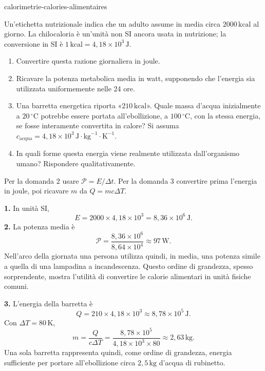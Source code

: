 \begin{exo}{calorimetrie-calories-alimentaires}

Un'etichetta nutrizionale indica che un adulto assume in media circa $2000\,\text{kcal}$ al giorno. La chilocaloria è un'unità non SI ancora usata in nutrizione; la conversione in SI è $1\,\text{kcal}=4{,}18\times10^3\,\text{J}$.

\begin{enumerate}
  \item Convertire questa razione giornaliera in joule.
  \item Ricavare la potenza metabolica media in watt, supponendo che l'energia sia utilizzata uniformemente nelle 24 ore.
  \item Una barretta energetica riporta «$210\,\text{kcal}$». Quale massa d'acqua inizialmente a $20\,^\circ\text{C}$ potrebbe essere portata all'ebollizione, a $100\,^\circ\text{C}$, con la stessa energia, se fosse interamente convertita in calore? Si assuma $c_{\text{acqua}}=4{,}18\times10^3\,\text{J}\!\cdot\!\text{kg}^{-1}\!\cdot\!\text{K}^{-1}$.
  \item In quali forme questa energia viene realmente utilizzata dall'organismo umano? Rispondere qualitativamente.
\end{enumerate}

\begin{indication}
Per la domanda 2 usare $\mathcal P=E/\Delta t$. Per la domanda 3 convertire prima l'energia in joule, poi ricavare $m$ da $Q=mc\Delta T$.
\end{indication}

\begin{solution}
\textbf{1.} In unità SI,
\[
E=2000\times4{,}18\times10^3=8{,}36\times10^6\,\text{J}.
\]
\textbf{2.} La potenza media è
\[
\mathcal P=\frac{8{,}36\times10^6}{8{,}64\times10^4}\approx97\,\text{W}.
\]
Nell'arco della giornata una persona utilizza quindi, in media, una potenza simile a quella di una lampadina a incandescenza. Questo ordine di grandezza, spesso sorprendente, mostra l'utilità di convertire le calorie alimentari in unità fisiche comuni.

\textbf{3.} L'energia della barretta è
\[
Q=210\times4{,}18\times10^3\approx8{,}78\times10^5\,\text{J}.
\]
Con $\Delta T=80\,\text{K}$,
\[
m=\frac{Q}{c\Delta T}
=\frac{8{,}78\times10^5}{4{,}18\times10^3\times80}
\approx2{,}63\,\text{kg}.
\]
Una sola barretta rappresenta quindi, come ordine di grandezza, energia sufficiente per portare all'ebollizione circa $2{,}5\,\text{kg}$ d'acqua di rubinetto.


\end{solution}
\end{exo}
